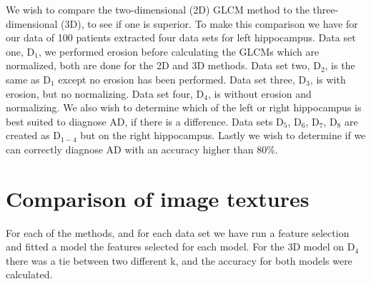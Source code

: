 
We wish to compare the two-dimensional (2D) GLCM method to the three-dimensional (3D), to see if one is superior. To make this comparison we have for our data of 100 patients extracted four data sets for left hippocampus. Data set one, D$_1$, we performed erosion before calculating the GLCMs which are normalized, both are done for the 2D and 3D methods. Data set two, D$_2$, is the same as D$_1$ except no erosion has been performed. Data set three, D$_3$, is with erosion, but no normalizing. Data set four, D$_4$, is without erosion and normalizing.
We also wish to determine which of the left or right hippocampus is best suited to diagnose AD, if there is a difference. Data sets D$_5$, D$_6$, D$_7$, D$_8$ are created as D$_{1-4}$ but on the right hippocampus. 
Lastly we wish to determine if we can correctly diagnose AD with an accuracy higher than 80\%.


\section{Comparison of image textures}
For each of the methods, and for each data set we have run a feature selection and fitted a model the features selected for each model. For the 3D model on D$_4$ there was a tie between two different k, and the accuracy for both models were calculated.

